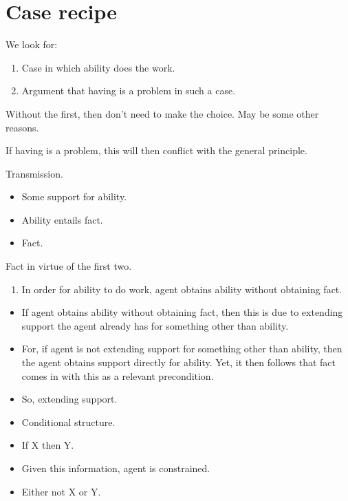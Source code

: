 \section{Case recipe}
\label{sec:case-recipe}

We look for:
\begin{enumerate}
\item Case in which ability does the work.
\item Argument that having is a problem in such a case.
\end{enumerate}

Without the first, then don't need to make the choice.
May be some other reasons.

If having is a problem, this will then conflict with the general principle.

Transmission.

\begin{itemize}
\item Some support for ability.
\item Ability entails fact.
\item Fact.
\end{itemize}

Fact in virtue of the first two.

\begin{enumerate}
\item In order for ability to do work, agent obtains ability without obtaining fact.
\end{enumerate}

\begin{itemize}
\item If agent obtains ability without obtaining fact, then this is due to extending support the agent already has for something other than ability.
\item For, if agent is not extending support for something other than ability, then the agent obtains support directly for ability.
  Yet, it then follows that fact comes in with this as a relevant precondition.
\end{itemize}

\begin{itemize}
\item So, extending support.
\end{itemize}

\begin{itemize}
\item Conditional structure.
\item If X then Y.
\item Given this information, agent is constrained.
\item Either not X or Y.
\end{itemize}


